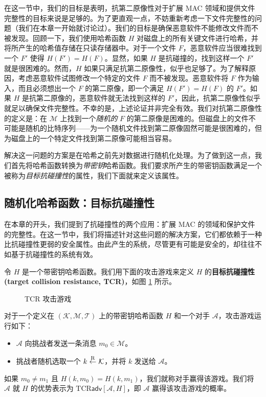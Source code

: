 在这一节中，我们的目标是表明，抗第二原像性对于扩展 MAC 领域和提供文件完整性的目标来说是足够的。为了更直观一点，不妨重新考虑一下文件完整性的问题（我们在本章一开始就讨论过）。我们的目标是确保恶意软件不能修改文件而不被发现。回顾一下，我们使用哈希函数 $H$ 对磁盘上的所有关键文件进行哈希，并将所产生的哈希值存储在只读存储器中。对于一个文件 $F$，恶意软件应当很难找到一个 $F'$ 使得 $H(F')=H(F)$。显然，如果 $H$ 是抗碰撞的，找到这样一个 $F'$ 就是很困难的。然而，$H$ 如果只满足抗第二原像性，似乎也足够了。为了解释原因，考虑恶意软件试图修改一个特定的文件 $F$ 而不被发现。恶意软件将 $F$ 作为输入，而且必须想出一个 $F$ 的第二原像，即一个满足 $H(F')=H(F)$ 的 $F′$。如果 $H$ 是抗第二原像的，恶意软件就无法找到这样的 $F'$，因此，抗第二原像性似乎就足以确保文件完整性。不幸的是，上述论证并非完全有效。我们对抗第二原像性的定义是：在 $\mathcal{M}$ 上找到一个\emph{随机的} $F$ 的第二原像是困难的。但磁盘上的文件不可能是随机的比特序列——为一个随机文件找到第二原像固然可能是很困难的，但为磁盘上的一个特定文件找到第二原像可能相当容易。

解决这一问题的方案是在哈希之前先对数据进行随机化处理。为了做到这一点，我们首先将哈希函数转换为\emph{带密钥}哈希函数。我们要求所产生的带密钥函数满足一个被称为\emph{目标抗碰撞性}的属性，我们下面就来定义该属性。

\subsection{随机化哈希函数：目标抗碰撞性}\label{subsec:8-11-2}

在本章的开头，我们提到了抗碰撞性的两个应用：扩展 MAC 的领域和保护文件的完整性。在这一节中，我们将描述针对这些问题的解决方案，它们都依赖于一种比抗碰撞性更弱的安全属性。由此产生的系统，尽管更有可能是安全的，却往往不如基于抗碰撞性的系统有效。

\begin{snote}[目标抗碰撞性。]
令 $H$ 是一个带密钥哈希函数。我们用下面的攻击游戏来定义 $H$ 的\textbf{目标抗碰撞性(target collision resistance, TCR)}，如图 \ref{fig:8-14} 所示。
\end{snote}

\begin{figure}
	\centering
	
	\caption{TCR 攻击游戏}
	\label{fig:8-14}
\end{figure}

\begin{game}[目标抗碰撞性]\label{game:8-5}
对于一个定义在 $(\mathcal{K},\mathcal{M},\mathcal{T})$ 上的带密钥哈希函数 $H$ 和一个对手 $\mathcal{A}$，攻击游戏运行如下：
\begin{itemize}
	\item $\mathcal{A}$ 向挑战者发送一条消息 $m_0\in\mathcal{M}$。
	\item 挑战者随机选取一个 $k\overset{\rm R}\leftarrow\mathcal{K}$，并将 $k$ 发送给 $\mathcal{A}$。
\end{itemize}
如果 $m_0\neq m_1$ 且 $H(k,m_0)=H(k,m_1)$，我们就称对手赢得该游戏。我们将 $\mathcal{A}$ 就 $H$ 的优势表示为 $\mathrm{TCR}\mathsf{adv}[\mathcal{A},H]$，即 $\mathcal{A}$ 赢得该攻击游戏的概率。
\end{game}

